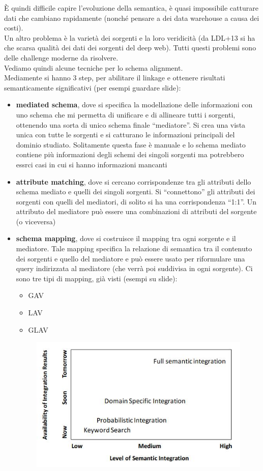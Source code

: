 \documentclass[a4paper,12pt, oneside]{book}
\begin{document}
È quindi difficile capire l'evoluzione della semantica, è quasi impossibile
catturare dati che cambiano rapidamente (nonché pensare a dei data warehouse a
causa dei costi).\\
Un altro problema è la varietà dei sorgenti e la loro veridicità (da LDL+13 si
ha che scarsa qualità dei dati dei sorgenti del deep web). Tutti questi problemi
sono delle challenge moderne da risolvere.\\
Vediamo quindi alcune tecniche per lo schema alignment.\\
Mediamente si hanno 3 step, per abilitare il linkage e ottenere risultati
semanticamente significativi (per esempi guardare slide): 
\begin{itemize}
  \item \textbf{mediated schema}, dove si specifica la modellazione delle
  informazioni con uno schema che mi permetta di unificare e di allineare tutti
  i sorgenti, ottenendo una sorta di unico schema finale ``mediatore''. Si crea
  una vista unica con tutte le sorgenti e si catturano le informazioni
  principali del dominio studiato. Solitamente questa fase è manuale  e lo
  schema mediato contiene più informazioni degli schemi dei singoli sorgenti ma
  potrebbero essrci casi in cui si hanno informazioni mancanti
  \item \textbf{attribute matching}, dove si cercano corrispondenze tra gli
  attributi dello schema mediato e quelli dei singoli sorgenti. Si
  ``connettono'' gli attributi dei sorgenti con quelli del mediatori, di solito
  si ha una corrispondenza ``1:1''. Un attributo del mediatore può essere una
  combinazioni di attributi del sorgente (o viceversa)
  \item \textbf{schema mapping}, dove si costruisce il mapping tra ogni sorgente
  e il mediatore. Tale mapping specifica la relazione di semantica tra il
  contenuto dei sorgenti e quello del mediatore e può essere usato per
  riformulare una query indirizzata al mediatore (che verrà poi suddivisa in
  ogni sorgente). Ci sono tre tipi di mapping, già visti (esempi su slide):
  \begin{itemize}
    \item GAV
    \item LAV
    \item GLAV
  \end{itemize}
  \begin{figure}
    \centering
    \includegraphics[scale = 0.5]{img/bds.jpg}

\end{figure}
\end{itemize}
\end{document}
